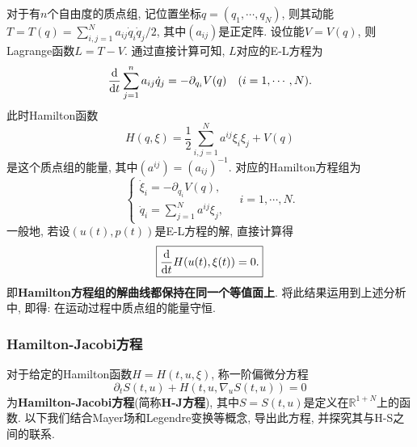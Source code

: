 \begin{example}
    对于有$n$个自由度的质点组, 记位置坐标$q = (q_1, \cdots, q_N)$, 则其动能$T = T(q) = \sum_{i, j = 1}^Na_{ij}\dot q_i\dot q_j/2$, 其中$(a_{ij})$是正定阵.
    设位能$V = V(q)$, 则Lagrange函数$L = T - V$. 通过直接计算可知, $L$对应的E-L方程为 
    \begin{equation*}
        \frac{{\rm d}}{{\rm d}t}\sum_{j = 1}^na_{ij}\dot q_j = -\partial_{q_i}V(q) \quad (i = 1, \cdots, N).
    \end{equation*}
    此时Hamilton函数 
    \begin{equation*}
        H(q, \xi) = \frac{1}{2}\sum_{i, j = 1}^Na^{ij}\xi_i\xi_j + V(q)
    \end{equation*}
    是这个质点组的能量, 其中$(a^{ij}) = (a_{ij})^{-1}$. 对应的Hamilton方程组为 
    \begin{equation*}
        \begin{cases} 
            \dot\xi_i = -\partial_{q_i}V(q), \\  
            \dot q_i = \sum_{j = 1}^Na^{ij}\xi_j,  
        \end{cases} 
        \quad i= 1, \cdots, N.
    \end{equation*}
    一般地, 若设$(u(t), p(t))$是E-L方程的解, 直接计算得 
    \begin{equation*}
        \boxed{\frac{{\rm d}}{{\rm d}t}H(u(t), \xi(t)) = 0.}
    \end{equation*}
    即\textbf{Hamilton方程组的解曲线都保持在同一个等值面上}. 将此结果运用到上述分析中, 即得: 在运动过程中质点组的能量守恒.
\end{example}

\subsubsection{Hamilton-Jacobi方程}

对于给定的Hamilton函数$H = H(t, u, \xi)$, 称一阶偏微分方程 
\begin{equation*}
    \boxed{\partial_tS(t, u) + H(t, u, \nabla_uS(t, u)) = 0}
\end{equation*}
为\textbf{Hamilton-Jacobi方程}(简称\textbf{H-J方程}), 其中$S = S(t, u)$是定义在$\mathbb{R}^{1 + N}$上的函数.
以下我们结合Mayer场和Legendre变换等概念, 导出此方程, 并探究其与H-S之间的联系.


